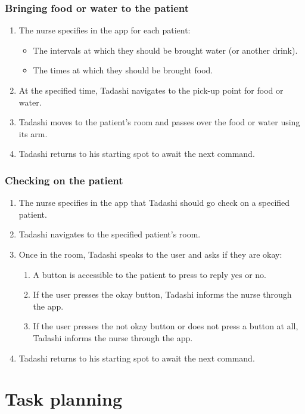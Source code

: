 \documentclass{article}
\begin{document}
\subsubsection{Bringing food or water to the patient}
\begin{enumerate}
\item The nurse specifies in the app for each patient:
  \begin{itemize}
  \item The intervals at which they should be brought water (or another drink).
  \item The times at which they should be brought food.
  \end{itemize}
\item At the specified time, Tadashi navigates to the pick-up point for food or water.
\item Tadashi moves to the patient's room and passes over the food or water using its arm.
\item Tadashi returns to his starting spot to await the next command.
\end{enumerate}


\subsubsection{Checking on the patient}
\begin{enumerate}
\item The nurse specifies in the app that Tadashi should go check on a specified patient. 
\item Tadashi navigates to the specified patient's room.
\item Once in the room, Tadashi speaks to the user and asks if they are okay:
  \begin{enumerate}
  \item A button is accessible to the patient to press to reply yes or no.
  \item If the user presses the okay button, Tadashi informs the nurse through the app. 
  \item If the user presses the not okay button or does not press a button at all, Tadashi informs the nurse through the app.
  \end{enumerate}
\item Tadashi returns to his starting spot to await the next command. 
\end{enumerate}

\section{Task planning}
\end{document}
